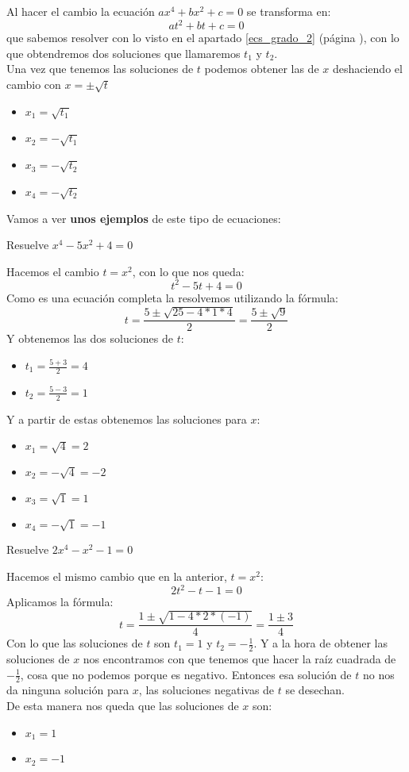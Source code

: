 \documentclass[a4paper,11pt,answers]{exam}
\begin{document}
Al hacer el cambio la ecuación $ax^4 + bx^2 +c = 0$ se transforma en:
\[at^2 + bt + c= 0\]
que sabemos resolver con lo visto en el apartado \ref{ecs_grado_2} (página \pageref{ecs_grado_2}), con lo que obtendremos dos soluciones que llamaremos $t_1$ y $t_2$.\\
Una vez que tenemos las soluciones de $t$ podemos obtener las de $x$ deshaciendo el cambio con $x =\pm \sqrt{t}$
\begin{itemize}
\item $x_1 = \sqrt{t_1}$
\item $x_2 = -\sqrt{t_1}$
\item $x_3 = -\sqrt{t_2}$
\item $x_4 = -\sqrt{t_2}$
\end{itemize}

Vamos a ver \textbf{unos ejemplos} de este tipo de ecuaciones:
\begin{questions}
\question Resuelve $x^4 - 5x^2 + 4 = 0$
  \begin{solution}
    Hacemos el cambio $t = x^2$, con lo que nos queda:
    \[t^2 - 5 t + 4 = 0\]
    Como es una ecuación completa la resolvemos utilizando la fórmula:
    \[t = \frac{5 \pm \sqrt{25 - 4*1*4}}{2} = \frac{5 \pm \sqrt{9}}{2}\]
    Y obtenemos las dos soluciones de $t$:
    \begin{itemize}
    \item $t_1 = \frac{5 + 3}{2} = 4$
    \item $t_2 = \frac{5 - 3}{2} = 1$
    \end{itemize}
    Y a partir de estas obtenemos las soluciones para $x$:
    \begin{itemize}
    \item $x_1 = \sqrt{4} = 2$
    \item $x_2 = -\sqrt{4} = -2$
    \item $x_3 = \sqrt{1} = 1$
    \item $x_4 = -\sqrt{1} = -1$
    \end{itemize}
  \end{solution}

\question Resuelve $2x^4 - x^2 - 1 = 0$
  \begin{solution}
    Hacemos el mismo cambio que en la anterior, $t = x^2$:
    \[2t^2 - t - 1= 0\]
    Aplicamos la fórmula:
    \[t = \frac{1 \pm \sqrt{1 - 4*2*(-1)}}{4} = \frac{1 \pm 3}{4}\]
    Con lo que las soluciones de $t$ son $t_1 = 1$ y $t_2 = -\frac{1}{2}$.
    Y a la hora de obtener las soluciones de $x$ nos encontramos con que tenemos que hacer la raíz cuadrada de $-\frac{1}{2}$, cosa que no podemos porque es negativo. Entonces esa solución de $t$ no nos da ninguna solución para $x$, las soluciones negativas de $t$ se desechan.\\
    De esta manera nos queda que las soluciones de $x$ son:
    \begin{itemize}
    \item $x_1 = 1$
      \item $x_2 = -1$
    \end{itemize}
  \end{solution}
\end{questions}
\end{document}
